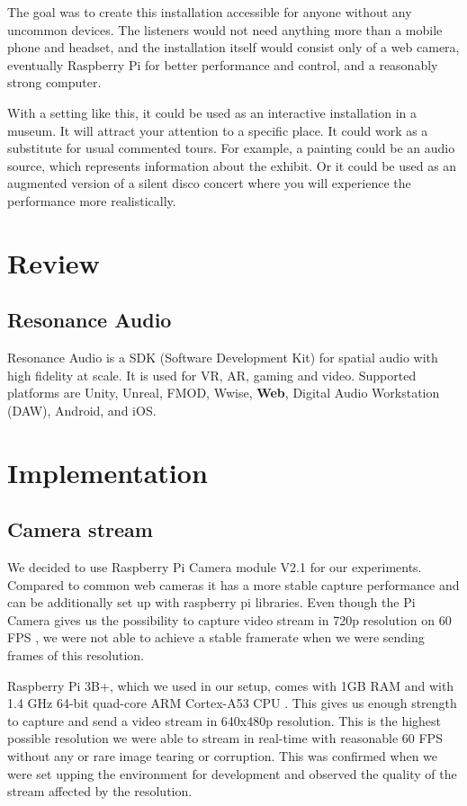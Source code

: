 \documentclass{ctuthesis}
\begin{document}
The goal was to create this installation accessible for anyone without any uncommon devices. The listeners would not need anything more than a mobile phone and headset, and the installation itself would consist only of a web camera, eventually Raspberry Pi for better performance and control, and a reasonably strong computer. 

With a setting like this, it could be used as an interactive installation in a museum. It will attract your attention to a specific place. It could work as a substitute for usual commented tours. For example, a painting could be an audio source, which represents information about the exhibit. 
Or it could be used as an augmented version of a silent disco concert where you will experience the performance more realistically.

\chapter{Review}
\section{Resonance Audio}
Resonance Audio is a SDK (Software Development Kit) for spatial audio with high fidelity at scale. It is used for VR, AR, gaming and video. Supported platforms are Unity, Unreal, FMOD, Wwise, \textbf{Web}, Digital Audio Workstation (DAW), Android, and iOS. 




\chapter{Implementation}
\section{Camera stream} \label {camera}
We decided to use Raspberry Pi Camera module V2.1 for our experiments. Compared to common web cameras it has a more stable capture performance and can be additionally set up with raspberry pi libraries. Even though the Pi Camera gives us the possibility to capture video stream in 720p resolution on 60 FPS \cite{2}, we were not able to achieve a stable framerate when we were sending frames of this resolution.

Raspberry Pi 3B+, which we used in our setup, comes with 1GB RAM and with 1.4 GHz 64-bit quad-core ARM Cortex-A53 CPU \cite{1}. This gives us enough strength to capture and send a video stream in 640x480p resolution. This is the highest possible resolution we were able to stream in real-time with reasonable 60 FPS without any or rare image tearing or corruption. This was confirmed when we were set upping the environment for development and observed the quality of the stream affected by the resolution.
\end{document}
